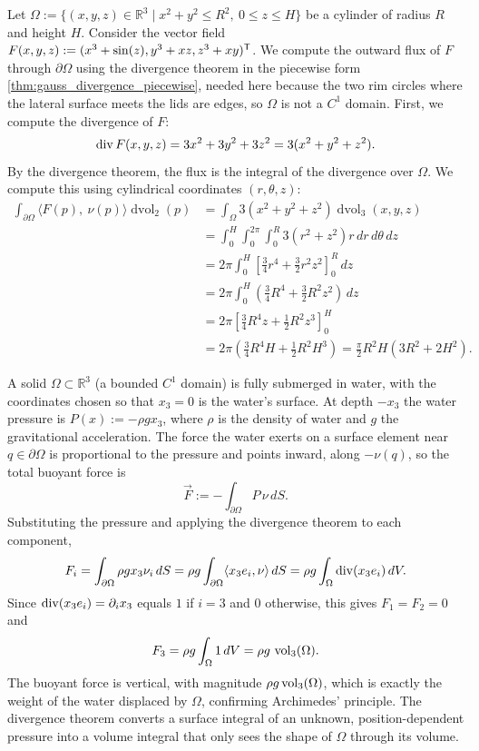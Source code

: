 \begin{example}
\label{ex:divergence_cylinder}
Let $\Omega := \{(x,y,z) \in \mathbb{R}^3 \mid x^2 + y^2 \leq R^2,\ 0 \leq z \leq H\}$ be a cylinder of radius $R$ and height $H$. Consider the vector field $F(x,y,z) := (x^3 + \sin(z), y^3 + xz, z^3 + xy)^{\mathsf{T}}$.
We compute the outward flux of $F$ through $\partial\Omega$ using the divergence theorem in
the piecewise form \cref{thm:gauss_divergence_piecewise}, needed here because the two rim circles
where the lateral surface meets the lids are edges, so $\Omega$ is not a $C^1$ domain.
First, we compute the divergence of $F$:
\[\operatorname{div} F(x,y,z) = 3x^2 + 3y^2 + 3z^2 = 3(x^2 + y^2 + z^2).\]
By the divergence theorem, the flux is the integral of the divergence over $\Omega$. We compute this using cylindrical coordinates $(r, \theta, z)$:
\begin{align*}
\int_{\partial\Omega} \langle F(p),\ \nu(p)\rangle \mathop{d\text{vol}}_2(p) &= \int_\Omega 3(x^2 + y^2 + z^2) \mathop{d\text{vol}}_3(x,y,z) \\
&= \int_0^H \int_0^{2\pi} \int_0^R 3(r^2 + z^2) r \,dr\,d\theta\,dz \\
&= 2\pi \int_0^H \left[ \frac{3}{4}r^4 + \frac{3}{2}r^2 z^2 \right]_0^R \,dz \\
&= 2\pi \int_0^H \left( \frac{3}{4}R^4 + \frac{3}{2}R^2 z^2 \right) \,dz \\
&= 2\pi \left[ \frac{3}{4}R^4 z + \frac{1}{2}R^2 z^3 \right]_0^H \\
&= 2\pi \left( \frac{3}{4}R^4 H + \frac{1}{2}R^2 H^3 \right) = \frac{\pi}{2}R^2 H (3R^2 + 2H^2).
\end{align*}
\end{example}

\begin{example}
\label{ex:archimedes_principle}
A solid $\Omega \subset \mathbb{R}^3$ (a bounded $C^1$ domain) is fully submerged in water, with
the coordinates chosen so that $x_3=0$ is the water's surface. At depth $-x_3$ the water
pressure is $P(x) := -\rho gx_3$, where $\rho$ is the density of water and $g$ the gravitational
acceleration. The force the water exerts on a surface element near $q \in \partial\Omega$ is
proportional to the pressure and points inward, along $-\nu(q)$, so the total buoyant force is
\[\vec F := -\int_{\partial\Omega}P\,\nu\,dS.\]
Substituting the pressure and applying the divergence theorem to each component,
\[F_i = \int_{\partial\Omega}\rho gx_3\nu_i\,dS
  = \rho g\int_{\partial\Omega}\langle x_3e_i,\nu\rangle\,dS
  = \rho g\int_\Omega\operatorname{div}(x_3e_i)\,dV.\]
Since $\operatorname{div}(x_3e_i) = \partial_i x_3$ equals $1$ if $i=3$ and $0$ otherwise, this gives
$F_1=F_2=0$ and
\[F_3 = \rho g\int_\Omega 1\,dV = \rho g\,\operatorname{vol}_3(\Omega).\]
The buoyant force is vertical, with magnitude $\rho g\operatorname{vol}_3(\Omega)$, which is exactly the weight
of the water displaced by $\Omega$, confirming Archimedes' principle. The divergence theorem
converts a surface integral of an unknown, position-dependent pressure into a volume integral
that only sees the shape of $\Omega$ through its volume.
\end{example}

